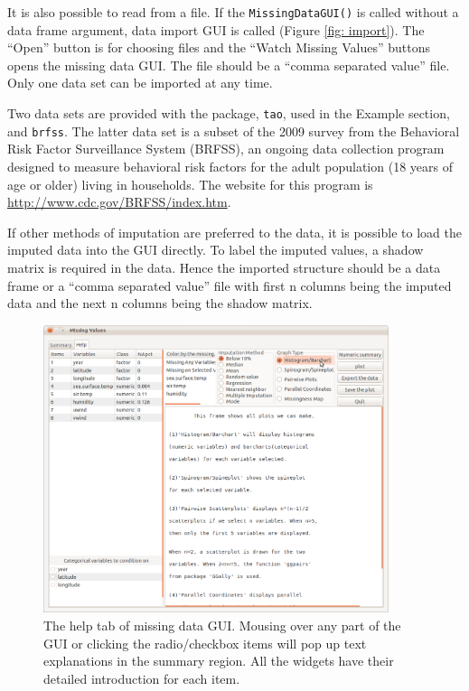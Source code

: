 \documentclass[article]{jss}
\begin{document}
It is also possible to read from a file.  If the \texttt{MissingDataGUI()} is called without a data frame argument, data import GUI is called (Figure \ref{fig: import}).  The ``Open'' button is for choosing files and the ``Watch Missing Values'' buttons opens the missing data GUI. The file should be a ``comma separated value'' file. Only one data set can be imported at any time.

Two data sets are provided with the package, \texttt{tao}, used in the Example section, and \texttt{brfss}. The latter data set is a subset of the 2009 survey from the Behavioral Risk Factor Surveillance System (BRFSS), an ongoing data collection program designed to measure behavioral risk factors for the adult population (18 years of age or older) living in households. The website for this program is \url{http://www.cdc.gov/BRFSS/index.htm}.

If other methods of imputation are preferred to the data, it is possible to load the imputed data into the GUI directly. To label the imputed values, a shadow matrix is required in the data. Hence the imported structure should be a data frame or a ``comma separated value'' file with first n columns being the imputed data and the next n columns being the shadow matrix.


\begin{center}
%
\begin{figure}[h]
\begin{centering}
\includegraphics[width=0.9\textwidth]{Miss_fig7}
\par\end{centering}

\caption{The help tab of missing data GUI. Mousing over any part of the GUI or clicking the radio/checkbox items will pop up text explanations in the summary region. All the widgets have their detailed introduction for each item.}
\label{fig: missingGUI-help}
\end{figure}

\par\end{center}
\end{document}
